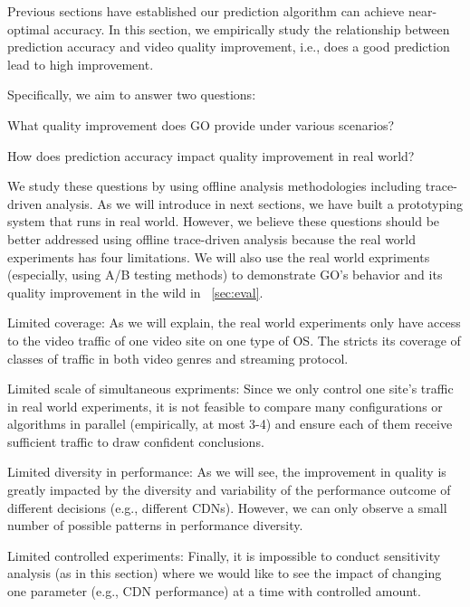 \label{sec:improvement}

Previous sections have established our prediction algorithm can achieve near-optimal accuracy. In this section, we empirically study the relationship between prediction accuracy and video quality improvement, i.e., does a good prediction lead to high improvement. 

Specifically, we aim to answer two questions:
\begin{packedenumerate}
	\item What quality improvement does GO provide under various scenarios?
	\item How does prediction accuracy impact quality improvement in real world?
\end{packedenumerate}

We study these questions by using offline analysis methodologies including trace-driven analysis. As we will introduce in next sections, we have built a prototyping system that runs in real world. However, we believe these questions should be better addressed using offline trace-driven analysis because the real world experiments has four limitations. We will also use the real world expriments (especially, using A/B testing methods) to demonstrate GO's behavior and its quality improvement in the wild in \Section~\ref{sec:eval}.
\begin{packedenumerate}
	\item Limited coverage: As we will explain, the real world experiments only have access to the video traffic of one video site on one type of OS. The stricts its coverage of classes of traffic in both video genres and streaming protocol.
	\item Limited scale of simultaneous expriments: Since we only control one site's traffic in real world experiments, it is not feasible to compare many configurations or algorithms in parallel (empirically, at most 3-4) and ensure each of them receive sufficient traffic to draw confident conclusions.
	\item Limited diversity in performance: As we will see, the improvement in quality is greatly impacted by the diversity and variability of the performance outcome of different decisions (e.g., different CDNs). However, we can only observe a small number of possible patterns in performance diversity.
	\item Limited controlled experiments: Finally, it is impossible to conduct sensitivity analysis (as in this section) where we would like to see the impact of changing one parameter (e.g., CDN performance) at a time with controlled amount.
\end{packedenumerate}


